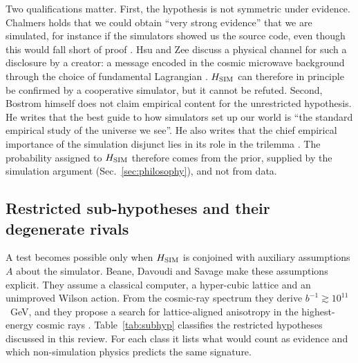 Two qualifications matter. First, the hypothesis is not symmetric under
evidence. Chalmers holds that we could obtain ``very strong evidence'' that we
are simulated, for instance if the simulators showed us the source code, even
though this would fall short of proof \cite{Chalmers2022can}. Hsu and Zee
discuss a physical channel for such a disclosure by a creator: a message
encoded in the cosmic microwave background through the choice of fundamental
Lagrangian \cite{Hsu2006message}. $H_{\rm SIM}$ can therefore in principle be confirmed
by a cooperative simulator, but it cannot be refuted. Second, Bostrom himself
does not claim empirical content for the unrestricted hypothesis. He writes
that the best guide to how simulators set up our world is ``the standard
empirical study of the universe we see''. He also writes that the chief
empirical importance of the simulation disjunct lies in its role in the
trilemma \cite{Bostrom2003are}. The probability assigned to $H_{\rm SIM}$
therefore comes from the prior, supplied by the simulation argument
(Sec.~\ref{sec:philosophy}), and not from data.

\subsection{Restricted sub-hypotheses and their degenerate rivals}
\label{sec:methodology:subhyp}

A test becomes possible only when $H_{\rm SIM}$ is conjoined with auxiliary
assumptions $A$ about the simulator. Beane, Davoudi and Savage make these
assumptions explicit. They assume a classical computer, a hyper-cubic lattice
and an unimproved Wilson action. From the cosmic-ray spectrum they derive
$b^{-1}\gtrsim 10^{11}$~GeV, and they propose a search for lattice-aligned
anisotropy in the highest-energy cosmic rays \cite{Beane2014constraints}.
Table~\ref{tab:subhyp} classifies the restricted hypotheses discussed in this
review. For each class it lists what would count as evidence and which
non-simulation physics predicts the same signature.

